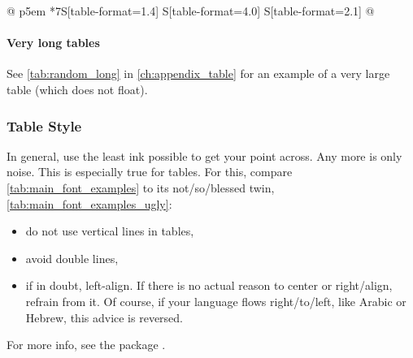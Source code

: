 \begin{landscape}
\begin{table}[tbp]
\begin{tabular}{
                @{}
                p{5em}
                *7{S[table-format=1.4]}
                S[table-format=4.0]
                S[table-format=2.1]
                @{}
            }
            \bottomrule
        \end{tabular}

    \end{table}
\end{landscape}

\paragraph{Very long tables}

See \cref{tab:random_long} in \cref{ch:appendix_table} for an example of a very large table (which does not float).

\subsubsection{Table Style}

In general, use the least ink possible to get your point across.
Any more is only noise.
This is especially true for tables.
For this, compare \cref{tab:main_font_examples} to its not\-/so\-/blessed
twin, \cref{tab:main_font_examples_ugly}:
\begin{itemize}
    \item do not use vertical lines in tables,
    \item avoid double lines,
    \item if in doubt, left-align.
          If there is no actual reason to center or right\-/align, refrain from it.
          Of course, if your language flows right\-/to\-/left, like Arabic or Hebrew,
          this advice is reversed.
\end{itemize}
For more info, see the package .

